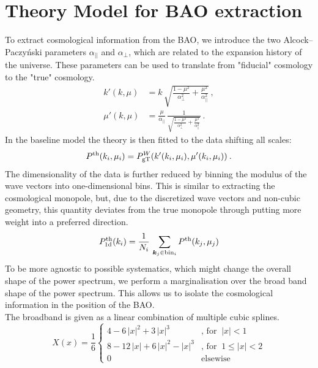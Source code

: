 \documentclass{article}
\begin{document}
\section{Theory Model for BAO extraction}
    To extract cosmological information from the BAO, we introduce the two Alcock--Paczyński parameters $\alpha_{||}$ and $\alpha_\perp$, which are related to the expansion history of the universe. These parameters can be used to translate from "fiducial" cosmology to the "true" cosmology.
    \begin{align}
        k'(k, \mu) &= k\,\sqrt{\frac{1 - \mu^2}{\alpha^2_\perp} + \frac{\mu^2}{\alpha_{||}^2}}\:,\\
        \mu'(k, \mu) &=  \frac{\mu}{\alpha_{||}}\,\frac{1}{\sqrt{\frac{1 - \mu^2}{\alpha^2_\perp} + \frac{\mu^2}{\alpha_{||}^2}}}\:.
    \end{align}
    In the baseline model the theory is then fitted to the data shifting all scales:
    \begin{equation}
        P^{\rm th}(k_i, \mu_i) = P^{W}_{\rm gT}(k'(k_i, \mu_i), \mu'(k_i, \mu_i))\:.
    \end{equation}
    The dimensionality of the data is further reduced by binning the modulus of the wave vectors into one-dimensional bins. This is similar to extracting the cosmological monopole, but, due to the discretized wave vectors and non-cubic geometry, this quantity deviates from the true monopole through putting more weight into a preferred direction.
    \begin{equation}
        P^{\rm th}_{\rm 1d}(k_i) = \frac{1}{N_i}\,\sum_{\boldsymbol{k}_j \in \text{bin}_i} P^{\rm th}(k_j, \mu_j)
    \end{equation}
    To be more agnostic to possible systematics, which might change the overall shape of the power spectrum, we perform a marginalisation over the broad band shape of the power spectrum. This allows us to isolate the cosmological information in the position of the BAO.\\
    The broadband is given as a linear combination of multiple cubic splines.
    \begin{equation}
        X(x) = \frac{1}{6}\begin{cases}
            4 - 6\,|x|^2 + 3\,|x|^3& \text{, for }\:|x|<1\\
            8 - 12 \,|x| + 6\,|x|^2 - |x|^3& \text{, for }\:1\leq|x|<2\\
            0& \text{elsewise}
        \end{cases}
    \end{equation}
\end{document}
